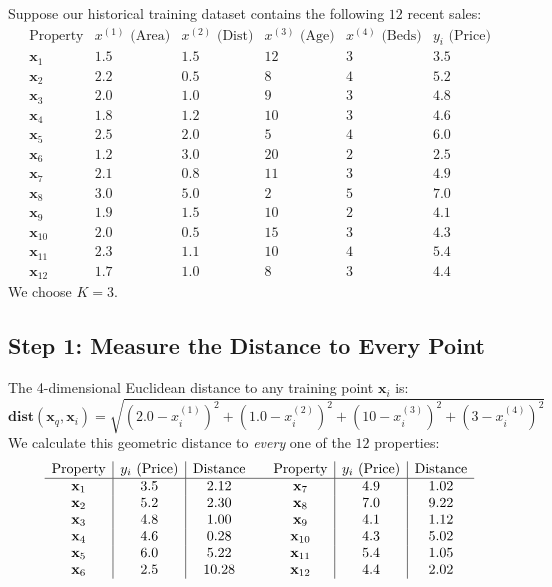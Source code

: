 \documentclass[12pt]{article}
\newcommand{\MVec}[1]{\mathbf{#1}}
\begin{document}
\noindent Suppose our historical training dataset contains the
following $12$ recent sales:
\[
    \begin{array}{c|cccc|c}
        \text{Property} &
            x^{(1)} \text{ (Area)} &
            x^{(2)} \text{ (Dist)} &
            x^{(3)} \text{ (Age)} &
            x^{(4)} \text{ (Beds)} &
            y_i \text{ (Price)} \\ \hline
        \MVec{x}_1 & 1.5 & 1.5 & 12 & 3 & 3.5 \\
        \MVec{x}_2 & 2.2 & 0.5 & 8  & 4 & 5.2 \\
        \MVec{x}_3 & 2.0 & 1.0 & 9  & 3 & 4.8 \\
        \MVec{x}_4 & 1.8 & 1.2 & 10 & 3 & 4.6 \\
        \MVec{x}_5 & 2.5 & 2.0 & 5  & 4 & 6.0 \\
        \MVec{x}_6 & 1.2 & 3.0 & 20 & 2 & 2.5 \\
        \MVec{x}_7 & 2.1 & 0.8 & 11 & 3 & 4.9 \\
        \MVec{x}_8 & 3.0 & 5.0 & 2  & 5 & 7.0 \\
        \MVec{x}_9 & 1.9 & 1.5 & 10 & 2 & 4.1 \\
        \MVec{x}_{10} & 2.0 & 0.5 & 15 & 3 & 4.3 \\
        \MVec{x}_{11} & 2.3 & 1.1 & 10 & 4 & 5.4 \\
        \MVec{x}_{12} & 1.7 & 1.0 & 8  & 3 & 4.4
    \end{array}
\]
We choose $K=3$.

\subsection*{Step 1: Measure the Distance to Every Point}
The 4-dimensional Euclidean distance to any training
point $\MVec{x}_i$ is:
\[
    \mathbf{dist}(\MVec{x}_q,\MVec{x}_i)
    = \sqrt{
        (2.0-x_i^{(1)})^2 +
        (1.0-x_i^{(2)})^2 +
        (10-x_i^{(3)})^2  +
        (3-x_i^{(4)})^2
    }
\]
We calculate this geometric distance to \textit{every} one of the $12$ properties:
\[
    \begin{array}{c|c|c@{\qquad}c|c|c}
        \text{Property} & y_i \text{ (Price)} & \text{Distance}
        & \text{Property} & y_i \text{ (Price)} & \text{Distance} \\ \hline
        \MVec{x}_1 & 3.5 & 2.12 & \MVec{x}_7 & 4.9 & 1.02 \\
        \MVec{x}_2 & 5.2 & 2.30 & \MVec{x}_8 & 7.0 & 9.22 \\
        \MVec{x}_3 & 4.8 & 1.00 & \MVec{x}_9 & 4.1 & 1.12 \\
        \MVec{x}_4 & 4.6 & 0.28 & \MVec{x}_{10} & 4.3 & 5.02 \\
        \MVec{x}_5 & 6.0 & 5.22 & \MVec{x}_{11} & 5.4 & 1.05 \\
        \MVec{x}_6 & 2.5 & 10.28 & \MVec{x}_{12} & 4.4 & 2.02
    \end{array}
\]
\end{document}
